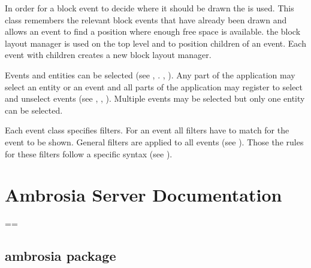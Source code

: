 \documentclass[letterpaper,10pt,english]{sphinxmanual}
\begin{document}
In order for a block event to decide where it should be drawn the {\hyperref[ambrosia_web.layout.BlockLayoutManager:ambrosia_web.layout.BlockLayoutManager]{}} is
used. This class remembers the relevant block events that have already been drawn and allows an event to find a position
where enough free space is available. the block layout manager is used on the top level and to position children of an
event. Each event with children creates a new block layout manager.

Events and entities can be selected (see {\hyperref[ambrosia_web.event.Event:ambrosia_web.event.Event.select]{}}
{\hyperref[ambrosia_web.event.Event:ambrosia_web.event.Event.selectAdd]{}}, {\hyperref[ambrosia_web.event.Event:ambrosia_web.event.Event.unselect]{}}.
{\hyperref[ambrosia_web.event:ambrosia_web.event.clearSelect]{}}, {\hyperref[ambrosia_web.entity.Entity:ambrosia_web.entity.Entity.select]{}}). Any part of the application
may select an entity or an event and all parts of the application may register to select and unselect events (see
, ,
). Multiple events may be selected but only one entity can be selected.

Each event class specifies filters. For an event all filters have to match for the event to be shown. General filters
are applied to all events (see {\hyperref[ambrosia_web.event.Event:ambrosia_web.event.Event]{}}). Those the rules for these filters follow a
specific syntax (see {\hyperref[ambrosia_web.filter.Filter:ambrosia_web.filter.Filter]{}}).


\section{Ambrosia Server Documentation}
\label{server:ambrosia-server-documentation}\label{server::doc}
==


\subsection{ambrosia package}
\label{ambrosia::doc}\label{ambrosia:ambrosia-package}
\end{document}
